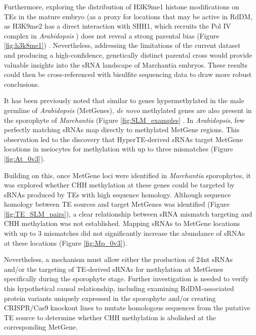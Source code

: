  Furthermore, exploring the distribution of H3K9me1 histone modifications on TEs in the mature embryo (as a proxy for locations that may be active in RdDM, as H3K9me2 has a direct interaction with SHH1, which recruits the Pol IV complex in \textit{Arabidopsis} \citep{RN116}) does not reveal a strong parental bias (Figure \ref{fig:h3k8me1}) \citep{RN160}. Nevertheless, addressing the limitations of the current dataset and producing a high-confidence, genetically distinct parental cross would provide valuable insights into the sRNA landscape of Marchantia embryos. These results could then be cross-referenced with bisulfite sequencing data to draw more robust conclusions.

It has been previously noted that similar to genes hypermethylated in the male germline of \textit{Arabidopsis} (MetGenes), \textit{de novo} methylated genes are also present in the sporophyte of \textit{Marchantia} (Figure \ref{fig:SLM_examples} \citep{jimmythesis}. In \textit{Arabidopsis}, few perfectly matching sRNAs map directly to methylated MetGene regions. This observation led to the discovery that HyperTE-derived sRNAs target MetGene locations in meiocytes for methylation with up to three mismatches \citep{RN187} (Figure \ref{fig:At_0v3}). 

Building on this, once MetGene loci were identified in \textit{Marchantia} sporophytes, it was explored whether CHH methylation  at these genes could be targeted by sRNAs produced by TEs with high sequence homology. Although sequence homology between TE sources and target MetGenes was identified (Figure \ref{fig:TE_SLM_pairs}), a clear relationship between sRNA mismatch targeting and CHH methylation was not established. Mapping sRNAs to MetGene locations with up to 3 mismatches did not significantly increase the abundance of sRNAs at these locations (Figure \ref{fig:Mp_0v3}). 

Nevertheless, a mechanism must allow either the production of 24nt sRNAs and/or the targeting of TE-derived sRNAs for methylation at MetGenes specifically during the sporophyte stage. Further investigation is needed to verify this hypothetical causal relationship, including examining RdDM-associated protein variants uniquely expressed in the sporophyte and/or creating CRISPR/Cas9 knockout lines to mutate homologous sequences from the putative TE source to determine whether CHH methylation is abolished at the corresponding MetGene.

